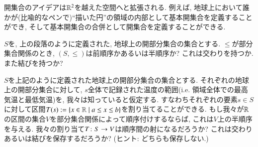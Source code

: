 
開集合のアイデアは${\mathbb R}^2$を越えた空間へと拡張される. 例えば, 地球上において誰かが(比喩的なペンで)``描いた円''の領域の内部として基本開集合を定義することができ, そして基本開集合の合併として開集合を定義することができる. 

\begin{exercise}
$S$を, 上の段落のように定義された, 地球上の開部分集合の集合とする. 
\sexc $\leq$が部分集合関係のとき, $(S,\leq)$は前順序かあるいは半順序か?
\next これは交わりを持つか. また結びを持つか?
\endsexc
\end{exercise}

\begin{exercise}\label{exc:cosheaf of temps}

$S$を上記のように定義された地球上の開部分集合の集合とする. それぞれの地球上の開部分集合に対して, $s$全体で記録された温度の範囲(i.e. 領域全体での最高気温と最低気温)を, 我々は知っていると仮定する. すなわちそれぞれの要素$s\in S$に対して区間$T(s):=\{x\in{\mathbb R}{\;|\;}a\leq x\leq b\}$を割り当てることができる. もし我々が${\mathbb R}$の区間の集合$V$を部分集合関係によって順序付けするならば, これは$V$上の半順序を与える.
\sexc 我々の割り当て$T\colon S\rightarrow V$は順序間の射になるだろうか?
\next これは交わりあるいは結びを保存するだろうか? (ヒント: どちらも保存しない.)
\endsexc
\end{exercise}

